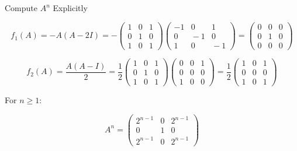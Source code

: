 \documentclass[10pt]{beamer}
\theoremstyle{definition}
\begin{document}
%
\begin{frame}{Compute $A^n$ Explicitly}

$$f_1(A) = -A(A - 2I) = -\begin{pmatrix} 1\!&\!0\!&\!1 \\ 0\!&\!1\!&\!0 \\ 1\!&\!0\!&\!1 \end{pmatrix}\!\begin{pmatrix} -1\!&\!0\!&\!1 \\ 0\!&\!-1\!&\!0 \\ 1\!&\!0\!&\!-1 \end{pmatrix} = \begin{pmatrix} 0&0&0 \\ 0&1&0 \\ 0&0&0 \end{pmatrix}$$

\vfill\pause

$$f_2(A) = \frac{A(A-I)}{2} = \frac{1}{2}\begin{pmatrix} 1\!&\!0\!&\!1 \\ 0\!&\!1\!&\!0 \\ 1\!&\!0\!&\!1 \end{pmatrix}\!\begin{pmatrix} 0\!&\!0\!&\!1 \\ 0\!&\!0\!&\!0 \\ 1\!&\!0\!&\!0 \end{pmatrix} = \frac{1}{2}\begin{pmatrix} 1&0&1 \\ 0&0&0 \\ 1&0&1 \end{pmatrix}$$

\vfill\pause

For $n \geq 1$:

$$\boxed{A^n = \begin{pmatrix} 2^{n-1} & 0 & 2^{n-1} \\ 0 & 1 & 0 \\ 2^{n-1} & 0 & 2^{n-1} \end{pmatrix}}$$

\end{frame}
\end{document}
